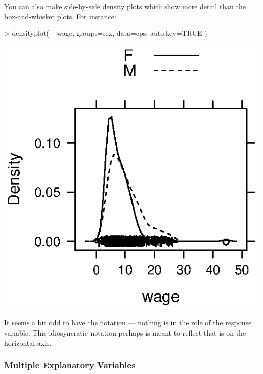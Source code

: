 You can also make side-by-side density plots which show more detail than the
box-and-whisker plots.  For instance:
\begin{Schunk}
\begin{Sinput}
> densityplot( ~ wage, groups=sex, data=cps, auto.key=TRUE )
\end{Sinput}
\end{Schunk}
\includegraphics{Figures/language-side-by-side-density}

\noindent 
It seems a bit odd to have the notation  --- nothing is in the role of the response variable.  This idiosyncratic notation perhaps is meant to
reflect that  is on the horizontal axis.

\subsubsection{Multiple Explanatory Variables}




